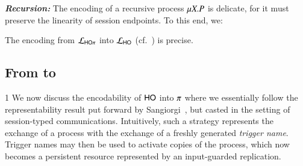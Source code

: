 {\bf\em Recursion:}
The encoding of a recursive process $\mu X. P$  is delicate, for it 
must preserve the linearity of session endpoints. To this end, we:

\smallskip 

\begin{theorem}
\label{f:enc:hopitoho}
The encoding from $\mathcal{L}_{\mathsf{HO}\pi}$ into $\mathcal{L}_{\mathsf{HO}}$ (cf.~)
is precise. 
\end{theorem}

\subsection{From \HOp to \sessp}
\label{subsec:HOp_to_sessp}1
\noi 
We now discuss the encodability of  $\mathsf{HO}$ into $\pi$ where
we essentially follow the representability result put forward by 
Sangiorgi~\cite{San92,SaWabook}, but casted in the setting of session-typed communications. 
Intuitively, such a strategy represents the exchange of a process with the exchange of a freshly generated \emph{trigger name}. 
Trigger names may then be used to activate copies of the process, which now becomes a persistent resource represented by an input-guarded replication.

